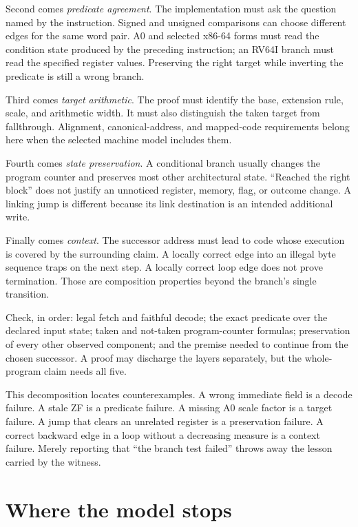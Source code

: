 Second comes \emph{predicate agreement}. The implementation must ask the
question named by the instruction. Signed and unsigned comparisons can choose
different edges for the same word pair. A0 and selected x86-64 forms must read
the condition state produced by the preceding instruction; an RV64I branch
must read the specified register values. Preserving the right target while
inverting the predicate is still a wrong branch.

Third comes \emph{target arithmetic}. The proof must identify the base,
extension rule, scale, and arithmetic width. It must also distinguish the
taken target from fallthrough. Alignment, canonical-address, and mapped-code
requirements belong here when the selected machine model includes them.

Fourth comes \emph{state preservation}. A conditional branch usually changes
the program counter and preserves most other architectural state. ``Reached
the right block'' does not justify an unnoticed register, memory, flag, or
outcome change. A linking jump is different because its link destination is an
intended additional write.

Finally comes \emph{context}. The successor address must lead to code whose
execution is covered by the surrounding claim. A locally correct edge into an
illegal byte sequence traps on the next step. A locally correct loop edge does
not prove termination. Those are composition properties beyond the branch's
single transition.

\begin{proofkit}[title={Five obligations for a direct conditional branch}]
Check, in order: legal fetch and faithful decode; the exact predicate over the
declared input state; taken and not-taken program-counter formulas; preservation
of every other observed component; and the premise needed to continue from
the chosen successor. A proof may discharge the layers separately, but the
whole-program claim needs all five.
\end{proofkit}

This decomposition locates counterexamples. A wrong immediate field is a
decode failure. A stale ZF is a predicate failure. A missing A0 scale factor is
a target failure. A jump that clears an unrelated register is a preservation
failure. A correct backward edge in a loop without a decreasing measure is a
context failure. Merely reporting that ``the branch test failed'' throws away
the lesson carried by the witness.

\section{Where the model stops}

